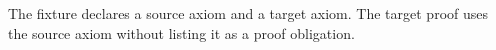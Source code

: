 The fixture declares a source axiom and a target axiom. The target proof uses
the source axiom without listing it as a proof obligation.
